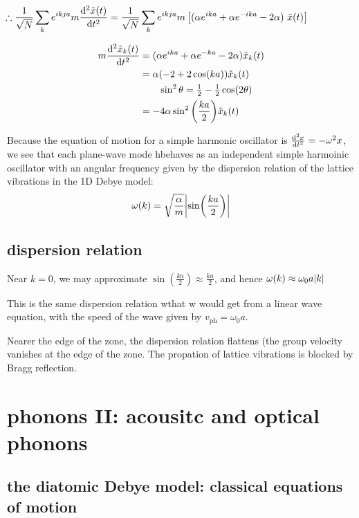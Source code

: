 \documentclass[10pt, a4paper, twocolumn]{article}
\begin{document}
\[
\hspace{-5em}
\therefore
\frac{1}{\sqrt N} \sum _k
e^{ikja}m \dv[2]{\tilde x(t)}{t}
= \frac{1}{\sqrt N} \sum _k
e^{ikja}m \left[
(\alpha e^{ika}+\alpha e^{-ika}-2\alpha)
\ \tilde x(t) \right] \]

\begin{equation*}
\begin{aligned}
m\dv[2]{\tilde x_k(t)}{t}&=
(\alpha e^{ika}+\alpha e^{-ka}-2\alpha)
\tilde x_k(t)
\\&= \alpha (-2+2\cos (ka))\tilde x_k(t)
\\&\qquad
\sin ^2\theta =\tfrac12 - \tfrac12 \cos (2\theta)
\\&= -4\alpha \sin ^2\pqty{\frac{ka}{2}}
\tilde x_k(t)
\end{aligned}
\end{equation*}

Because the equation of motion for a simple harmonic oscillator is $\dv[2]{x}{t}=-\omega ^2x$, we see that each plane-wave mode hbehaves as an independent simple harmoinic oscillator with an angular frequency given by the dispersion relation of the lattice vibrations in the 1D Debye model:
\[\omega (k)=\sqrt{\frac{\alpha}{m}}
\vqty{\sin(\frac{ka}{2})}\]

\subsection{dispersion relation}

Near $k=0$, we may approximate $\sin(\frac{ka}{2})\approx \frac{ka}{2}$, and hence
 $\omega (k)\approx \omega _0 a \abs{k}$

This is the same dispersion relation wthat w would get from a linear wave equation, with the speed of the wave given by $v_\mathrm{ph}=\omega _0a$.

Nearer the edge of the zone, the dispersion relation flattens (the group velocity vanishes at the edge of the zone. The propation of lattice vibrations is blocked by Bragg reflection.

\section{phonons II: acousitc and optical phonons}

\subsection{the diatomic Debye model: classical equations of motion}
\end{document}
